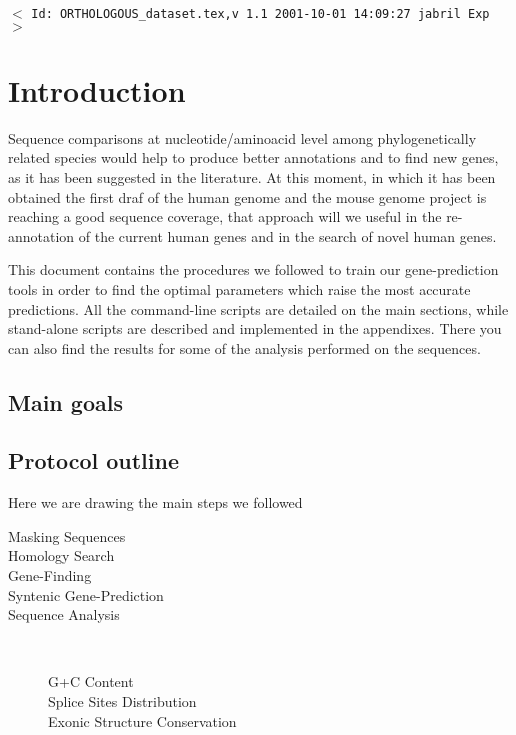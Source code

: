\documentclass[11pt]{article}
\newcommand{\sctn}[1]{\section{#1}}
\newcommand{\subsctn}[1]{\subsection{#1}}
\begin{document}
\tableofcontents
\listoftables
\listoffigures

\vfill
\begin{center}
{\small$<$ \verb$Id: ORTHOLOGOUS_dataset.tex,v 1.1 2001-10-01 14:09:27 jabril Exp $$>$ }
\end{center}


\newpage
{}
\setcounter{page}{1}

\sctn{Introduction}

Sequence comparisons at nucleotide/aminoacid level among phylogenetically related species would help to produce better annotations and to find new genes, as it has been suggested in the literature. At this moment, in which it has been obtained the first draf of the human genome and the mouse genome project is reaching a good sequence coverage, that approach will we useful in the re-annotation of the current human genes and in the search of novel human genes. 
\begin{comment}
Homology between human and mouse sequences serves as a useful guide for identifying genes in both organisms. Additionally, conserved sequences that have no coding potential are good candidates for regulatory elements.
-- From \url|http://bio.cse.psu.edu/mousegroup/doc.html|
An annotation of the orthologous test set of genomic sequences and their regulatory regions is available at \url|http://bio.cse.psu.edu/mousegroup/test8/|
\end{comment}

This document contains the procedures we followed to train our gene-prediction tools in order to find the optimal parameters which raise the most accurate predictions. All the command-line scripts are detailed on the main sections, while stand-alone scripts are described and implemented in the appendixes. There you can also find the results for some of the analysis performed on the sequences. 

\subsctn{Main goals}

\subsctn{Protocol outline}

Here we are drawing the main steps we followed 

\begin{description}
 \item[Masking Sequences]
 \item[Homology Search]
 \item[Gene-Finding]
 \item[Syntenic Gene-Prediction]
 \item[Sequence Analysis] \ \\
   \begin{description}
    \item[G+C Content]
    \item[Splice Sites Distribution]
    \item[Exonic Structure Conservation]
   \end{description}
\end{description}
\end{document}
